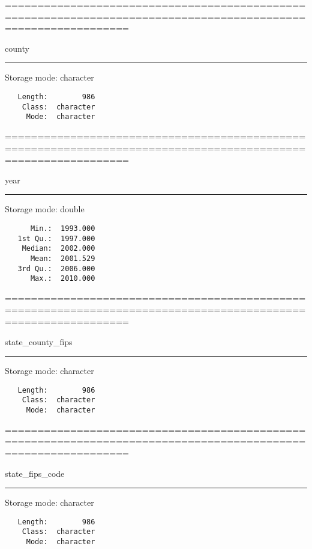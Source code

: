 \documentclass[]{article}
\title{}
\author{}
\date{}
\begin{document}
===============================================================================================================

county

\begin{center}\rule{0.5\linewidth}{\linethickness}\end{center}

Storage mode: character

\begin{verbatim}
   Length:        986  
    Class:  character  
     Mode:  character  
\end{verbatim}

===============================================================================================================

year

\begin{center}\rule{0.5\linewidth}{\linethickness}\end{center}

Storage mode: double

\begin{verbatim}
      Min.:  1993.000  
   1st Qu.:  1997.000  
    Median:  2002.000  
      Mean:  2001.529  
   3rd Qu.:  2006.000  
      Max.:  2010.000  
\end{verbatim}

===============================================================================================================

state\_county\_fips

\begin{center}\rule{0.5\linewidth}{\linethickness}\end{center}

Storage mode: character

\begin{verbatim}
   Length:        986  
    Class:  character  
     Mode:  character  
\end{verbatim}

===============================================================================================================

state\_fips\_code

\begin{center}\rule{0.5\linewidth}{\linethickness}\end{center}

Storage mode: character

\begin{verbatim}
   Length:        986  
    Class:  character  
     Mode:  character  
\end{verbatim}
\end{document}
